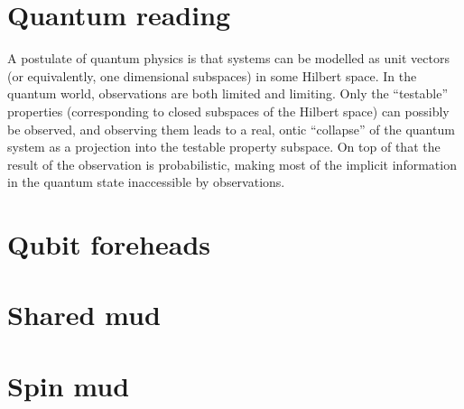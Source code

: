 \documentclass[a4paper]{article}
\begin{document}
\section*{Quantum reading}
A postulate of quantum physics is that systems can be modelled as unit vectors
(or equivalently, one dimensional subspaces) in some Hilbert space.
In the quantum world, observations are both limited and limiting. Only the
``testable'' properties (corresponding to closed subspaces of the Hilbert space) 
can possibly be observed, and observing them leads to a real, ontic ``collapse''
of the quantum system as a projection into the testable property subspace. On
top of that the result of the observation is probabilistic, making most of the
implicit information in the quantum state inaccessible by observations.

\section*{Qubit foreheads}

\section*{Shared mud}

\section*{Spin mud}
\end{document}
